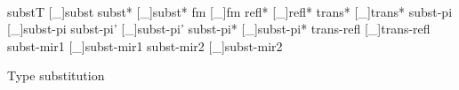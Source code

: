 \begin{code}
\>[2]\<[14]%
\>[14]\AgdaSymbol{\{} \AgdaSymbol{:} \AgdaFunction{[}  \AgdaFunction{]}   \AgdaSymbol{\}\{} \AgdaSymbol{:} \AgdaFunction{[}  \AgdaFunction{]}   \AgdaSymbol{\}}\<%
\\
\>[2]\<[14]%
\>[14]\AgdaSymbol{\{} \AgdaSymbol{:}    \AgdaSymbol{\}\{} \AgdaSymbol{:}    \AgdaSymbol{\}}  \<[45]%
\>[45]\<%
\\
\>[2]\<[14]%
\>[14]\AgdaFunction{[}   \AgdaFunction{]}       \AgdaFunction{[}   \AgdaFunction{]}     \<%
\\
\>[0]\<[2]%
\>[2]  \AgdaSymbol{=} \AgdaFunction{[}  \AgdaSymbol{\_} \AgdaFunction{]sym} \AgdaSymbol{(} \AgdaSymbol{(}\AgdaFunction{[}  \AgdaSymbol{\_} \AgdaFunction{]sym} \AgdaSymbol{))}\<%
\\
%
\\
\>   \<[15]%
\>[15]\<%
\\
\>[0]\<[2]%
\>[2] \AgdaSymbol{(}substT  [\_]subst\AgdaSymbol{;} subst*  [\_]subst*\AgdaSymbol{;} fm  [\_]fm \AgdaSymbol{;}
            refl*  [\_]refl* \AgdaSymbol{;} trans*  [\_]trans*\AgdaSymbol{;} 
            subst-pi  [\_]subst-pi \AgdaSymbol{;}
            subst-pi'  [\_]subst-pi' \AgdaSymbol{;} subst-pi*  [\_]subst-pi* \AgdaSymbol{;}
            trans-refl  [\_]trans-refl \AgdaSymbol{;} subst-mir1  [\_]subst-mir1 \AgdaSymbol{;}
            subst-mir2  [\_]subst-mir2\AgdaSymbol{)}\<%
\\
\>\<\end{code}

Type substitution

